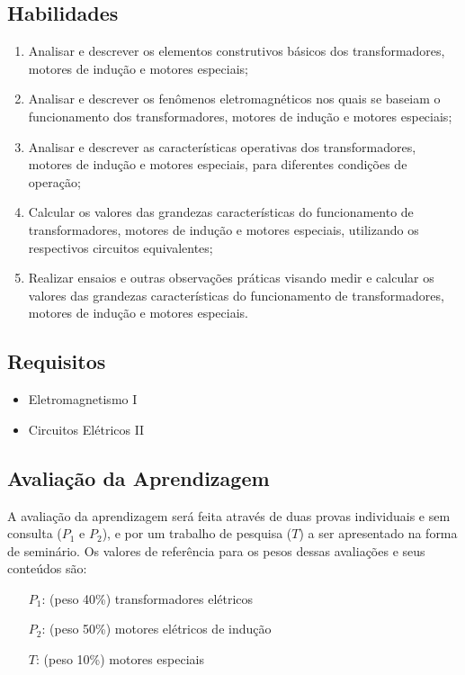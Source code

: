 \documentclass[10pt, a4paper]{article}
\begin{document}
    \subsection*{Habilidades}
    \begin{enumerate}[label=\roman*)]
        \item Analisar e descrever os elementos construtivos básicos dos transformadores, motores de indução e motores
especiais;
        \item Analisar e descrever os fenômenos eletromagnéticos nos quais se baseiam o funcionamento dos transformadores,
motores de indução e motores especiais;
        \item Analisar e descrever as características operativas dos transformadores, motores de indução e motores especiais,
para diferentes condições de operação;
        \item Calcular os valores das grandezas características do funcionamento de transformadores, motores de indução e
motores especiais, utilizando os respectivos circuitos equivalentes;
        \item Realizar ensaios e outras observações práticas visando medir e calcular os valores das grandezas características do
funcionamento de transformadores, motores de indução e motores especiais.
    \end{enumerate}

    \subsection*{Requisitos}
    \begin{itemize}
        \item Eletromagnetismo I
        \item Circuitos Elétricos II
    \end{itemize}


    \subsection*{Avaliação da Aprendizagem}
    A avaliação da aprendizagem será feita através de duas provas individuais e sem consulta ($P_1$ e $P_2$), e por um trabalho de
    pesquisa ($T$) a ser apresentado na forma de seminário.
    Os valores de referência para os pesos dessas avaliações e seus conteúdos são:
    \begin{itemize}[itemsep=0mm]
    \item[$P_1$:] (peso 40\%) transformadores elétricos
    \item[$P_2$:] (peso 50\%) motores elétricos de indução
    \item[$T$:] (peso 10\%) motores especiais
    \end{itemize}
\end{document}
